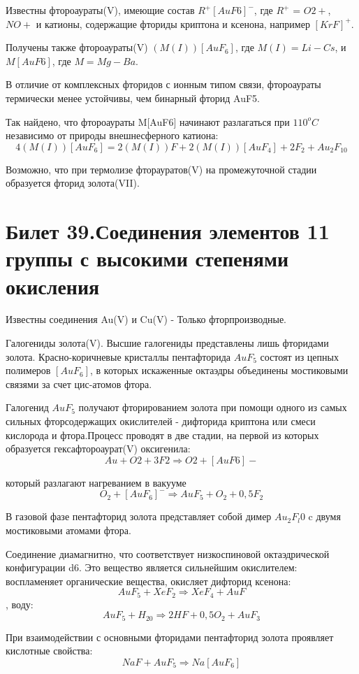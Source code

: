 \documentclass[11pt]{article}
\begin{document}
Известны фтороаураты(V), имеющие состав $R^+[AuF6]^-$, где $R^+$ = $O2+$, $NO+$ и
катионы, содержащие фториды криптона и ксенона, например $[KrF]^+$. 

Получены также
фтороаураты(V) $(M(I))[AuF_6]$, где $M(I) = Li-Cs$, и $M[AuF6]$, где $M = Mg-Ba$.

В отличие от комплексных фторидов с ионным типом связи, фтороаураты
термически менее устойчивы, чем бинарный фторид AuF5.

Так найдено, что фтороаураты  M[AuF6] начинают разлагаться при
$110^oC$ независимо от природы внешнесферного катиона:
$$4(M(I))[AuF_6] = 2(M(I))F + 2(M(I))[AuF_4] + 2F_2 + Au_2F_{10}$$

Возможно, что при термолизе фторауратов(V) на промежуточной стадии
образуется фторид золота(VII).




\section{Билет 39.Соединения элементов 11 группы с высокими степенями окисления}

Известны соединения Au(V) и Cu(V) - Только фторпроизводные.

Галогениды золота(V). Высшие галогениды представлены лишь фторидами золота. Красно-коричневые кристаллы
пентафторида $AuF_5$ состоят из цепных полимеров $[AuF_6]$, в которых искаженные октаэдры объединены мостиковыми связями за счет цис-атомов фтора. 

Галогенид $AuF_5$ получают фторированием золота при помощи одного из самых
сильных фторсодержащих окислителей - дифторида криптона или смеси кислорода и фтора.Процесс проводят в две
стадии, на первой из которых образуется гексафтороаурат(V) оксигенила:
$$Au + O2 + 3F2\Rightarrow O2+[AuF6]-$$

который разлагают нагреванием в вакууме
$$O_2+[AuF_6]^- \Rightarrow AuF_5 + O_2 + 0,5F_2$$

В газовой фазе пентафторид золота представляет собой димер $Au_2F _l0$ c двумя мостиковыми атомами фтора.

Соединение диамагнитно, что соответствует низкоспиновой октаэдрической конфигурации d6. Это вещество является сильнейшим окислителем: воспламеняет органические вещества, окисляет дифторид ксенона:
$$AuF_5 + XeF_2 \Rightarrow XeF_4 + AuF$$,
воду:
$$AuF_5 + H_20 \Rightarrow 2HF + 0,5O_2 + AuF_3$$

При взаимодействии с основными фторидами пентафторид золота проявляет кислотные свойства:
$$NaF + AuF_5 \Rightarrow Na[AuF_6]$$
\end{document}
